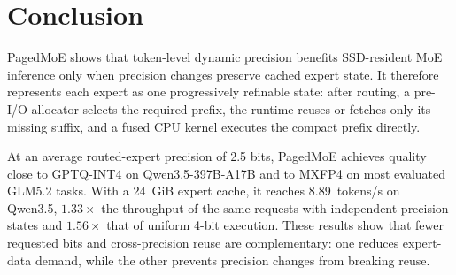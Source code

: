 \documentclass[sigconf, nonacm]{acmart}
\begin{document}
\section{Conclusion}

PagedMoE shows that token-level dynamic precision benefits
SSD-resident MoE inference only when precision changes preserve cached
expert state. It therefore represents each expert as one progressively
refinable state: after routing, a pre-I/O allocator selects the required
prefix, the runtime reuses or fetches only its missing suffix, and a
fused CPU kernel executes the compact prefix directly.

At an average routed-expert precision of 2.5 bits, PagedMoE achieves
quality close to GPTQ-INT4 on Qwen3.5-397B-A17B and to MXFP4 on most evaluated GLM5.2 tasks. With a 24~GiB expert
cache, it reaches 8.89~tokens/s on Qwen3.5, \(1.33\times\) the throughput of the
same requests with independent precision states and \(1.56\times\)
that of uniform 4-bit execution. These results show that fewer
requested bits and cross-precision reuse are complementary: one
reduces expert-data demand, while the other prevents precision changes
from breaking reuse.






\end{document}
